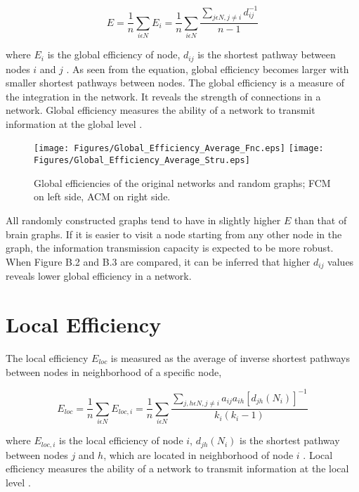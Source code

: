\begin{equation}
E = \frac{1}{n}\sum\limits_{i \epsilon N} E_i = \frac{1}{n}\sum\limits_{i \epsilon N} \frac{\sum\limits_{j \epsilon N, j\neq i}d_{ij}^{-1}}{n-1 }
\end{equation}

where $E_i$ is the global efficiency of node, $d_{ij}$ is the shortest pathway between nodes $i$ and $j$ \citep{LAT01}. As seen from the equation, global efficiency becomes larger with smaller shortest pathways between nodes. The global efficiency is a measure of the integration in the network. It reveals the strength of connections in a network. Global efficiency measures the ability of a network to transmit information at the global level \citep{XYZDA}.


\begin{figure}[htbp]
 
  \centering
	 \texttt{[image: Figures/Global\_Efficiency\_Average\_Fnc.eps]}
	 \texttt{[image: Figures/Global\_Efficiency\_Average\_Stru.eps]}
  \caption[Global Efficiency]{Global efficiencies of the original networks and random graphs; FCM on left side, ACM on right side.} 
    \label{fig:Global Efficiency}
 	
\end{figure}

All randomly constructed graphs tend to have in slightly higher $E$ than that of brain graphs. If it is easier to visit a node starting from any other node in the graph, the information transmission capacity is expected to be more robust. When Figure B.2 and B.3 are compared, it can be inferred that higher $d_{ij}$ values reveals lower global efficiency in a network. 



\section{Local Efficiency}
The local efficiency $E_{loc}$ is measured as the average of inverse shortest pathways between nodes in neighborhood of a specific node, 

\begin{equation}
E_{loc} = \frac{1}{n}\sum\limits_{i \epsilon N} E_{loc,i} = \frac{1}{n}\sum\limits_{i \epsilon N} \frac{\sum\limits_{j,h \epsilon N, j\neq i} a_{ij} a_{ih}[d_{jh}(N_i)]^{-1}}{k_i(k_i - 1) }
\end{equation}

where $E_{loc,i}$ is the local efficiency of node $i$, $d_{jh}(N_i)$ is the shortest pathway between nodes $j$ and $h$, which are located in neighborhood of node $i$ \citep{LAT01}. Local efficiency measures the ability of a network to transmit information at the local level \citep{XYZDA}.


